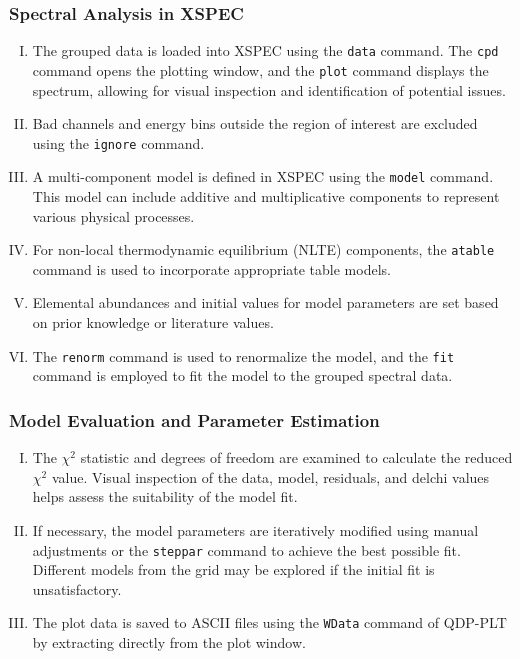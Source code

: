 			\subsubsection{Spectral Analysis in XSPEC}
				\begin{enumerate}[I.]
					\item The grouped data is loaded into XSPEC using the \texttt{data} command. The \texttt{cpd} command opens the plotting window, and the \texttt{plot} command displays the spectrum, allowing for visual inspection and identification of potential issues.
					\item Bad channels and energy bins outside the region of interest are excluded using the \texttt{ignore} command.
					\item A multi-component model is defined in XSPEC using the \texttt{model} command. This model can include additive and multiplicative components to represent various physical processes.
					\item For non-local thermodynamic equilibrium (NLTE) components, the \texttt{atable} command is used to incorporate appropriate table models.
					\item Elemental abundances and initial values for model parameters are set based on prior knowledge or literature values.
					\item The \texttt{renorm} command is used to renormalize the model, and the \texttt{fit} command is employed to fit the model to the grouped spectral data.
				\end{enumerate}
			
			\subsubsection{Model Evaluation and Parameter Estimation}
				\begin{enumerate}[I.]
					\item The $\chi^2$ statistic and degrees of freedom are examined to calculate the reduced $\chi^2$ value. Visual inspection of the data, model, residuals, and delchi values helps assess the suitability of the model fit.
					\item If necessary, the model parameters are iteratively modified using manual adjustments or the \texttt{steppar} command to achieve the best possible fit. Different models from the grid may be explored if the initial fit is unsatisfactory.
					\item The plot data is saved to ASCII files using the \texttt{WData} command of QDP-PLT by extracting directly from the plot window.
				\end{enumerate}
			
